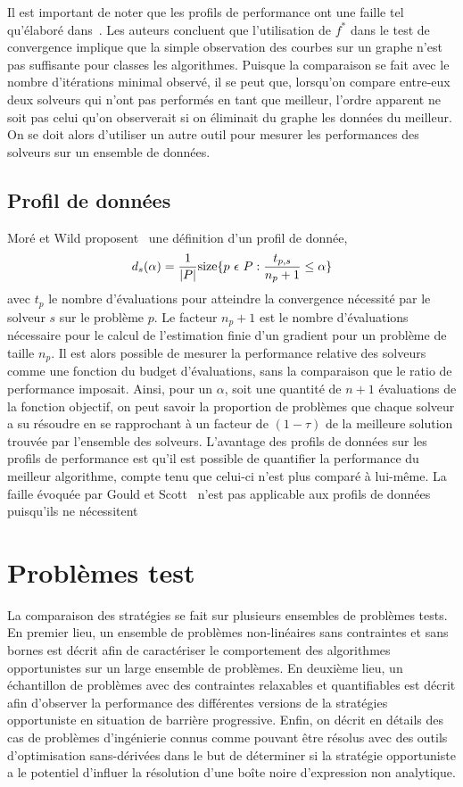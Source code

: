 Il est important de noter que les profils  de performance ont une faille tel qu'élaboré dans~\cite{GoSc2016}. Les auteurs concluent que l'utilisation de $f^*$ dans le test de convergence implique que la simple observation des courbes sur un graphe n'est pas suffisante pour classes les algorithmes. Puisque la comparaison se fait avec le nombre d'itérations minimal observé, il se peut que, lorsqu'on compare entre-eux deux solveurs qui n'ont pas performés en tant que meilleur, l'ordre apparent ne soit pas celui qu'on observerait si on éliminait du graphe les données du meilleur. On se doit alors d'utiliser un autre outil pour mesurer les performances des solveurs sur un ensemble de données.
\subsection{Profil de données}\label{sec:pdd}
Moré et Wild proposent~\cite{MoWi2009} une définition d'un profil de donnée, 
\begin{equation*}
d_s(\alpha)=\frac{1}{|P|}\text{size}\{p\ \epsilon \ P : \frac{t_{p,s}}{n_p+1} \leq \alpha \}\\
\end{equation*}
avec $t_p$ le nombre d'évaluations pour atteindre la convergence nécessité par le solveur $s$ sur le problème $p$. Le facteur $n_p+1$ est le nombre d'évaluations nécessaire pour le calcul de l'estimation finie d'un gradient pour un problème de taille $n_p$. Il est alors possible de mesurer la performance relative des solveurs comme une fonction du budget d'évaluations, sans la comparaison que le ratio de performance imposait. Ainsi, pour un $\alpha$, soit une quantité de $n+1$ évaluations de la fonction objectif, on peut savoir la proportion de problèmes que chaque solveur a su résoudre en se rapprochant à un facteur de $(1-\tau)$ de la meilleure solution trouvée par l'ensemble des solveurs. L'avantage des profils de données sur les profils de performance est qu'il est possible de quantifier la performance du meilleur algorithme, compte tenu que celui-ci n'est plus comparé à lui-même. La faille évoquée par Gould et Scott~\cite{GoSc2016} n'est pas applicable aux profils de données puisqu'ils ne nécessitent
\section{Problèmes test}\label{sec:pro}
La comparaison des stratégies se fait sur plusieurs ensembles de problèmes tests. En premier lieu, un ensemble de problèmes non-linéaires sans contraintes et sans bornes est décrit afin de caractériser le comportement des algorithmes opportunistes sur un large ensemble de problèmes. En deuxième lieu, un échantillon de problèmes avec des contraintes relaxables et quantifiables est décrit afin d'observer la performance des différentes versions de la stratégies opportuniste en situation de barrière progressive. Enfin, on décrit en détails des cas de problèmes d'ingénierie connus comme pouvant être résolus avec des outils d'optimisation sans-dérivées dans le but de déterminer si la stratégie opportuniste a le potentiel d'influer la résolution d'une boîte noire d'expression non analytique.
